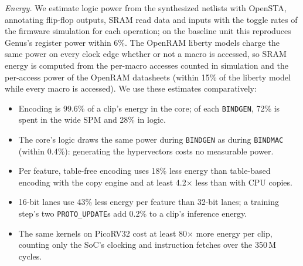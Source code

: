\documentclass[conference]{IEEEtran}
\begin{document}
\emph{Energy.} We estimate logic power from the synthesized netlists with OpenSTA, annotating flip-flop outputs, SRAM read data and inputs with the toggle rates of the firmware simulation for each operation; on the baseline unit this reproduces Genus's register power within 6\%. The OpenRAM liberty models charge the same power on every clock edge whether or not a macro is accessed, so SRAM energy is computed from the per-macro accesses counted in simulation and the per-access power of the OpenRAM datasheets (within 15\% of the liberty model while every macro is accessed). We use these estimates comparatively:
\begin{itemize}
\item Encoding is 99.6\% of a clip's energy in the core; of each \texttt{BINDGEN}, 72\% is spent in the wide SPM and 28\% in logic.
\item The core's logic draws the same power during \texttt{BINDGEN} as during \texttt{BINDMAC} (within 0.4\%): generating the hypervectors costs no measurable power.
\item Per feature, table-free encoding uses 18\% less energy than table-based encoding with the copy engine and at least 4.2$\times$ less than with CPU copies.
\item 16-bit lanes use 43\% less energy per feature than 32-bit lanes; a training step's two \texttt{PROTO\_UPDATE}s add 0.2\% to a clip's inference energy.
\item The same kernels on PicoRV32 cost at least 80$\times$ more energy per clip, counting only the SoC's clocking and instruction fetches over the 350\,M cycles.
\end{itemize}
\end{document}
